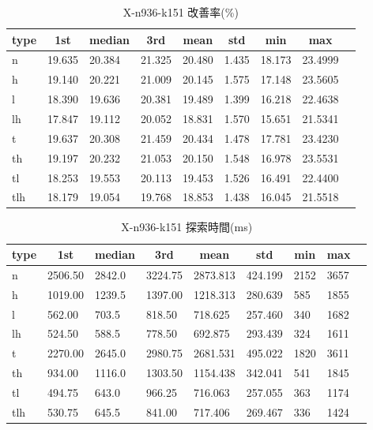 \begin{table}[htbp]
    \caption{X-n936-k151 改善率(\%)}
    \begin{tabular}{|l|l|l|l|l|l|l|l|l|}\hline
    \multicolumn{1}{|c|}{\textbf{type}}
    &\multicolumn{1}{|c|}{\textbf{1st}}
    &\multicolumn{1}{c|}{\textbf{median}}
    &\multicolumn{1}{c|}{\textbf{3rd}}
    &\multicolumn{1}{c|}{\textbf{mean}}
    &\multicolumn{1}{c|}{\textbf{std}}
    &\multicolumn{1}{c|}{\textbf{min}}
    &\multicolumn{1}{c|}{\textbf{max}}\\\hline
	n & 19.635 & 20.384 & 21.325 & 20.480 & 1.435 & 18.173 & 23.4999\\\hline
	h & 19.140 & 20.221 & 21.009 & 20.145 & 1.575 & 17.148 & 23.5605\\\hline
	l & 18.390 & 19.636 & 20.381 & 19.489 & 1.399 & 16.218 & 22.4638\\\hline
	lh & 17.847 & 19.112 & 20.052 & 18.831 & 1.570 & 15.651 & 21.5341\\\hline
	t & 19.637 & 20.308 & 21.459 & 20.434 & 1.478 & 17.781 & 23.4230\\\hline
	th & 19.197 & 20.232 & 21.053 & 20.150 & 1.548 & 16.978 & 23.5531\\\hline
	tl & 18.253 & 19.553 & 20.113 & 19.453 & 1.526 & 16.491 & 22.4400\\\hline
	tlh & 18.179 & 19.054 & 19.768 & 18.853 & 1.438 & 16.045 & 21.5518\\\hline
	\end{tabular}
\end{table}
\begin{table}[htbp]
    \caption{X-n936-k151 探索時間(ms)}
    \begin{tabular}{|l|l|l|l|l|l|l|l|l|}\hline
    \multicolumn{1}{|c|}{\textbf{type}}
    &\multicolumn{1}{|c|}{\textbf{1st}}
    &\multicolumn{1}{c|}{\textbf{median}}
    &\multicolumn{1}{c|}{\textbf{3rd}}
    &\multicolumn{1}{c|}{\textbf{mean}}
    &\multicolumn{1}{c|}{\textbf{std}}
    &\multicolumn{1}{c|}{\textbf{min}}
    &\multicolumn{1}{c|}{\textbf{max}}\\\hline
	n & 2506.50 & 2842.0 & 3224.75 & 2873.813 & 424.199 & 2152 & 3657\\\hline
	h & 1019.00 & 1239.5 & 1397.00 & 1218.313 & 280.639 & 585 & 1855\\\hline
	l & 562.00 & 703.5 & 818.50 & 718.625 & 257.460 & 340 & 1682\\\hline
	lh & 524.50 & 588.5 & 778.50 & 692.875 & 293.439 & 324 & 1611\\\hline
	t & 2270.00 & 2645.0 & 2980.75 & 2681.531 & 495.022 & 1820 & 3611\\\hline
	th & 934.00 & 1116.0 & 1303.50 & 1154.438 & 342.041 & 541 & 1845\\\hline
	tl & 494.75 & 643.0 & 966.25 & 716.063 & 257.055 & 363 & 1174\\\hline
	tlh & 530.75 & 645.5 & 841.00 & 717.406 & 269.467 & 336 & 1424\\\hline
	\end{tabular}
\end{table}
